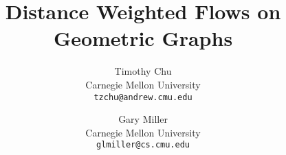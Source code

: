 


\title{Distance Weighted Flows on Geometric Graphs}
\author{
  Timothy Chu \\
  Carnegie Mellon University\\
  \texttt{tzchu@andrew.cmu.edu}
  \and
  Gary Miller\\
  Carnegie Mellon University\\
  \texttt{glmiller@cs.cmu.edu} \\
}

\setcounter{page}{0}
\maketitle
\thispagestyle{empty}

\clearpage


\begin{appendix}
\end{appendix}

